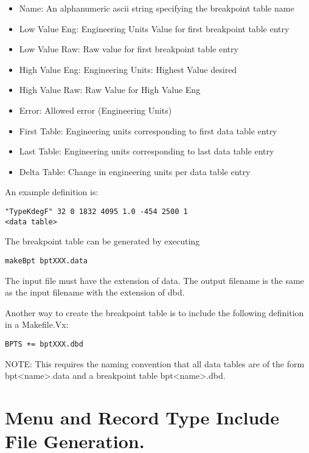 \begin{itemize}\item Name: An alphanumeric ascii string specifying the breakpoint table name

\item Low Value Eng: Engineering Units Value for first breakpoint table entry

\item Low Value Raw: Raw value for first breakpoint table entry

\item High Value Eng: Engineering Units: Highest Value desired

\item High Value Raw: Raw Value for High Value Eng

\item Error: Allowed error (Engineering Units)

\item First Table: Engineering units corresponding to first data table entry

\item Last Table: Engineering units corresponding to last data table entry

\item Delta Table: Change in engineering units per data table entry

\end{itemize} An example definition is:

\begin{verbatim}"TypeKdegF" 32 0 1832 4095 1.0 -454 2500 1
<data table>
\end{verbatim}The breakpoint table can be generated by executing

\begin{verbatim}makeBpt bptXXX.data
\end{verbatim}The input file must have the extension of data. The output filename is the same as the input filename with the extension of 
dbd.

Another way to create the breakpoint table is to include the following definition in a Makefile.Vx:

\begin{verbatim}BPTS += bptXXX.dbd
\end{verbatim}NOTE: This requires the naming convention that all data tables are of the form bpt\textless{}name\textgreater{}.data and a breakpoint table 
bpt\textless{}name\textgreater{}.dbd.

\section{Menu and Record Type Include File Generation.}

